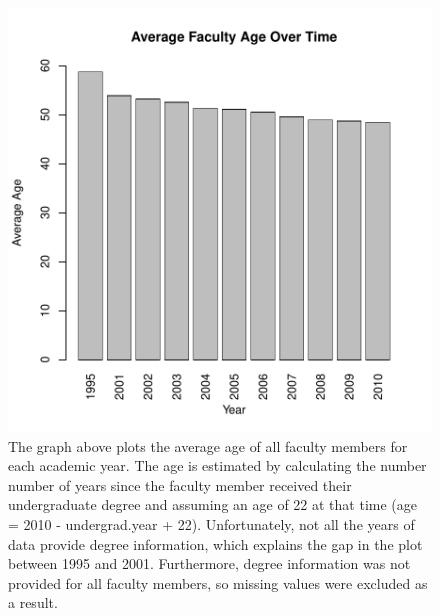 \documentclass[a4paper]{report}
\begin{document}
\begin{article}
\begin{figure}
  \centering
  \vspace*{.1in}
\includegraphics{faculty-003}
\caption{
The graph above plots the average age of all faculty members for each
academic year. The age is estimated by calculating the number number
of years since the faculty member received their undergraduate degree
and assuming an age of 22 at that time (age = 2010 - undergrad.year +
22). Unfortunately, not all the years of data provide degree
information, which explains the gap in the plot between 1995 and
2001. Furthermore, degree information was not provided for all faculty
members, so missing values were excluded as a result.
}

\end{figure}



\end{article}
\end{document}
